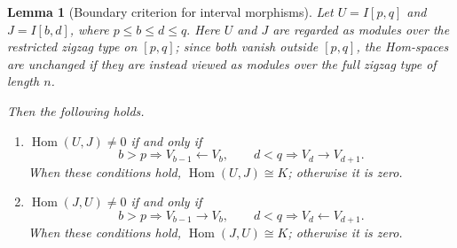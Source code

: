 \documentclass[11pt]{amsart}
\numberwithin{equation}{section}
\newtheorem{lemma}[theorem]{Lemma}
\theoremstyle{definition}
\begin{document}
\begin{lemma}[Boundary criterion for interval morphisms]\label{lem:hom}
Let $U=I[p,q]$ and $J=I[b,d]$, where
\(
p\le b\le d\le q.
\) Here $U$ and $J$ are regarded as modules over the restricted zigzag type on
$[p,q]$; since both vanish outside $[p,q]$, the Hom-spaces are unchanged if
they are instead viewed as modules over the full zigzag type of length $n$.


Then the following holds. 
\begin{enumerate}
\item $\operatorname{Hom}(U,J)\ne0$ if and only if
\[
b>p\Longrightarrow V_{b-1}\longleftarrow V_b,
\qquad
d<q\Longrightarrow V_d\longrightarrow V_{d+1}.
\]
When these conditions hold,
$\operatorname{Hom}(U,J)\cong K$; otherwise it is zero.
\item $\operatorname{Hom}(J,U)\ne0$ if and only if
\[
b>p\Longrightarrow V_{b-1}\longrightarrow V_b,
\qquad
d<q\Longrightarrow V_d\longleftarrow V_{d+1}.
\]
When these conditions hold,
$\operatorname{Hom}(J,U)\cong K$; otherwise it is zero.
\end{enumerate}
\end{lemma}
\end{document}
